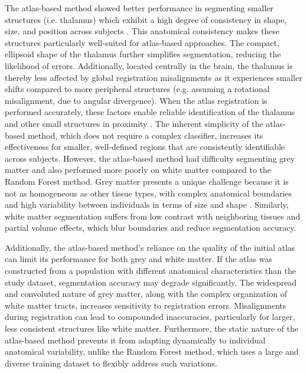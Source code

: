 The atlas-based method showed better performance in segmenting smaller structures (i.e. thalamus) which exhibit a high degree of consistency in shape, size, and position across subjects \cite{b16}. This anatomical consistency makes these structures particularly well-suited for atlas-based approaches. The compact, ellipsoid shape of the thalamus further simplifies segmentation, reducing the likelihood of errors. Additionally, located centrally in the brain, the thalamus is thereby less affected by global registration misalignments as it experiences smaller shifts compared to more peripheral structures (e.g. assuming a rotational misalignment, due to angular divergence). When the atlas registration is performed accurately, these factors enable reliable identification of the thalamus and other small structures in proximity \cite{b17}. The inherent simplicity of the atlas-based method, which does not require a complex classifier, increases its effectiveness for smaller, well-defined regions that are consistently identifiable across subjects. However, the atlas-based method had difficulty segmenting grey matter and also performed more poorly on white matter compared to the Random Forest method. Grey matter presents a unique challenge because it is not as homogeneous as other tissue types, with complex anatomical boundaries and high variability between individuals in terms of size and shape \cite{b18}. Similarly, white matter segmentation suffers from low contrast with neighboring tissues and partial volume effects, which blur boundaries and reduce segmentation accuracy.

Additionally, the atlas-based method's reliance on the quality of the initial atlas can limit its performance for both grey and white matter. If the atlas was constructed from a population with different anatomical characteristics than the study dataset, segmentation accuracy may degrade significantly. The widespread and convoluted nature of grey matter, along with the complex organization of white matter tracts, increases sensitivity to registration errors. Misalignments during registration can lead to compounded inaccuracies, particularly for larger, less consistent structures like white matter. Furthermore, the static nature of the atlas-based method prevents it from adapting dynamically to individual anatomical variability, unlike the Random Forest method, which uses a large and diverse training dataset to flexibly address such variations. 


